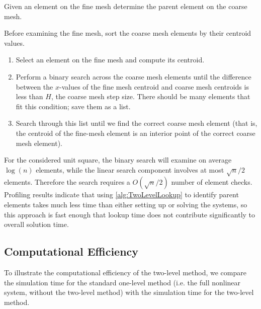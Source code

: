 \begin{algorithm}%
  \caption{ Given an element on the fine mesh determine the parent element on
  the coarse mesh.}
  \label{alg:TwoLevelLookup}
  Before examining the fine mesh, sort the coarse mesh elements by their
  centroid values.
  \begin{enumerate}[Step 1:]
    \item Select an element on the fine mesh and compute its centroid.
    \item Perform a binary search across the coarse mesh elements until
      the difference between the $ x $-values of the fine mesh centroid
      and coarse mesh centroids is less than $ H $, the coarse mesh step
      size. There should be many elements that fit this condition; save
      them as a list.
    \item Search through this list until we find the correct coarse mesh
      element (that is, the centroid of the fine-mesh element is an
      interior point of the correct coarse mesh element).
  \end{enumerate}
\end{algorithm}

For the considered unit square, the binary search will examine on average
$\log(n)$ elements, while the linear search component involves at most
$\sqrt{n}/2$ elements. Therefore the search requires a $O(\sqrt{n}/2)$ number of
element checks. Profiling results indicate that using
\autoref{alg:TwoLevelLookup} to identify parent elements takes much less time
than either setting up or solving the systems, so this approach is fast enough
that lookup time does not contribute significantly to overall solution time.

\subsection{Computational Efficiency}\label{sse:Efficiency}
To illustrate the computational efficiency of the two-level method, we compare
the simulation time for the standard one-level method (i.e. the full nonlinear
system, without the two-level method) with the simulation time for the two-level
method.

